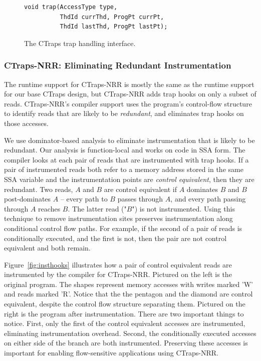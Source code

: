 \documentclass[preprint,9pt]{sigplanconf}
\newcommand{\ctraps}{CTraps\xspace}
\newcommand{\ctrapsmm}{CTraps-NRR\xspace}
\begin{document}
\begin{figure}[htb]
\centering
\begin{verbatim}
void trap(AccessType type, 
          ThdId currThd, ProgPt currPt,
          ThdId lastThd, ProgPt lastPt);
\end{verbatim}
\caption{\label{fig:hookapi}The \ctraps trap handling interface.}
\end{figure}



\subsubsection{\ctrapsmm: Eliminating Redundant Instrumentation}
\label{sec:dpo}

The runtime support for \ctrapsmm is mostly the same as the runtime support for
our base \ctraps design, but \ctrapsmm adds trap hooks on only a subset of
reads.  \ctrapsmm's compiler support uses the program's control-flow structure
to identify reads that are likely to be {\em redundant}, and eliminates trap
hooks on those accesses.

We use dominator-based analysis to eliminate instrumentation that is likely to
be redundant.  Our analysis is function-local and works on code in SSA form.
The compiler looks at each pair of reads that are instrumented with trap hooks.
If a pair of instrumented reads both refer to a memory address stored in the
same SSA variable and the instrumentation points are {\em control equivalent},
then they are redundant.  Two reads, $A$ and $B$ are control equivalent if $A$
dominates $B$ and $B$ post-dominates $A$ -- every path to $B$ passes through
$A$, and every path passing through $A$ reaches $B$.  The latter read ("$B$")
is not instrumented.  Using this technique to remove instrumentation sites
preserves instrumentation along conditional control flow paths.  For example,
if the second of a pair of reads is conditionally executed, and the first is
not, then the pair are not control equivalent and both remain.  

Figure~\ref{fig:insthooks} illustrates how a pair of control equivalent reads
are instrumented by the compiler for \ctrapsmm.  Pictured on the left is the
original program.  The shapes represent memory accesses with writes marked 'W'
and reads marked 'R'.  Notice that the the pentagon and the diamond are control
equivalent, despite the control flow structure separating them.  Pictured on
the right is the program after instrumentation.  There are two important things
to notice.  First, only the first of the control equivalent accesses are
instrumented, eliminating instrumentation overhead.  Second, the conditionally
executed accesses on either side of the branch are both instrumented.
Preserving these accesses is important for enabling flow-sensitive applications
using \ctrapsmm.  
\end{document}
